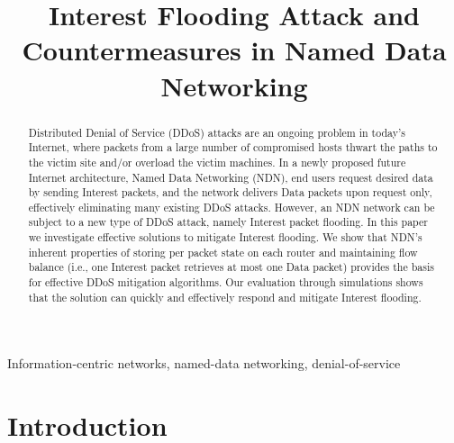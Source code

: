 \documentclass[10pt,conference]{IEEEtran}
\begin{document}
\title{Interest Flooding Attack and Countermeasures in Named Data Networking}

\author{
}

\maketitle

\begin{abstract}
Distributed Denial of Service (DDoS) attacks are an ongoing problem in today's Internet, where packets from a large number of compromised hosts thwart the paths to the victim site and/or overload the victim machines. 
In a newly proposed future Internet architecture, Named Data Networking (NDN), end users request desired data by sending Interest packets, and the network delivers Data packets upon request only, effectively eliminating many existing DDoS attacks. 
However, an NDN network can be subject to a new type of DDoS attack, namely Interest packet flooding.  
In this paper we investigate effective solutions to mitigate Interest flooding.
We show that NDN's inherent properties of storing per packet state on each router and maintaining flow balance (i.e., one Interest packet retrieves at most one Data packet) provides the  basis for effective DDoS mitigation algorithms.
Our evaluation through simulations shows that the solution can quickly and effectively respond and mitigate Interest flooding.
\end{abstract}

\begin{IEEEkeywords}
Information-centric networks, named-data networking, denial-of-service
\end{IEEEkeywords}

\section{Introduction}
\label{sec:intro}
\end{document}
